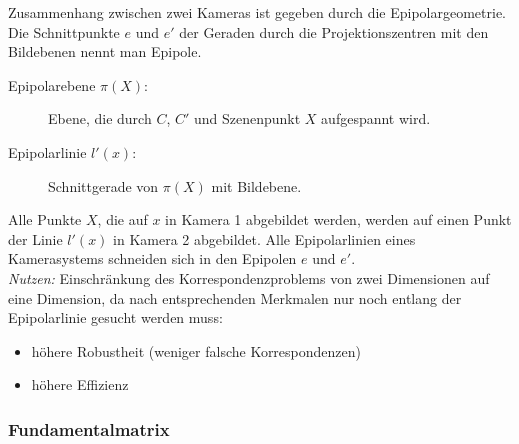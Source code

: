 Zusammenhang zwischen zwei Kameras ist gegeben durch die Epipolargeometrie. Die Schnittpunkte $e$ und $e'$ der Geraden durch die Projektionszentren mit den Bildebenen nennt man Epipole.
\begin{description}
\item[Epipolarebene $\pi(X)$:] Ebene, die durch $C$, $C'$ und Szenenpunkt $X$ aufgespannt wird.
\item[Epipolarlinie $l'(x)$:] Schnittgerade von $\pi(X)$ mit Bildebene.
\end{description}
Alle Punkte $X$, die auf $x$ in Kamera 1 abgebildet werden, werden auf einen Punkt der Linie $l'(x)$ in Kamera 2 abgebildet. Alle Epipolarlinien eines Kamerasystems schneiden sich in den Epipolen $e$ und $e'$. \\
\textsl{Nutzen:} Einschränkung des Korrespondenzproblems von zwei Dimensionen auf eine Dimension, da nach entsprechenden Merkmalen nur noch entlang der Epipolarlinie gesucht werden muss:
\begin{itemize}
\item höhere Robustheit (weniger falsche Korrespondenzen)
\item höhere Effizienz
\end{itemize}

\subsubsection*{Fundamentalmatrix}

